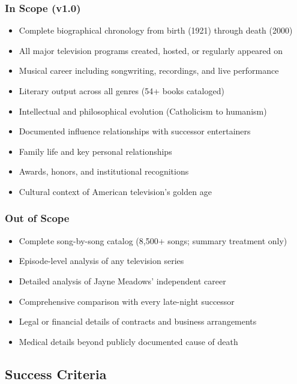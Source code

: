 \documentclass[11pt,letterpaper]{article}
\begin{document}
\subsubsection{In Scope (v1.0)}
\begin{itemize}[leftmargin=2em]
\item Complete biographical chronology from birth (1921) through death (2000)
\item All major television programs created, hosted, or regularly appeared on
\item Musical career including songwriting, recordings, and live performance
\item Literary output across all genres (54+ books cataloged)
\item Intellectual and philosophical evolution (Catholicism to humanism)
\item Documented influence relationships with successor entertainers
\item Family life and key personal relationships
\item Awards, honors, and institutional recognitions
\item Cultural context of American television's golden age
\end{itemize}

\subsubsection{Out of Scope}
\begin{itemize}[leftmargin=2em]
\item Complete song-by-song catalog (8,500+ songs; summary treatment only)
\item Episode-level analysis of any television series
\item Detailed analysis of Jayne Meadows' independent career
\item Comprehensive comparison with every late-night successor
\item Legal or financial details of contracts and business arrangements
\item Medical details beyond publicly documented cause of death
\end{itemize}

\subsection{Success Criteria}
\end{document}
